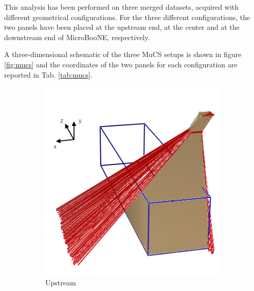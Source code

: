\documentclass[a4paper]{scrartcl}
\begin{document}
This analysis has been performed on three merged datasets, acquired with different geometrical configurations. For the three different configurations, the two panels have been placed at the upstream end, at the center and at the downstream end of MicroBooNE, respectively.

A three-dimensional schematic of the three MuCS setups is shown in figure \ref{fig:mucs} and the coordinates of the two panels for each configuration are reported in Tab. \ref{tab:mucs}.
\begin{figure}[htbp]
  \begin{subfigure}{0.30\textwidth}
    \includegraphics[width=\linewidth]{figures/upstream.png}
    \caption{Upstream} \label{fig:upstream}
  \end{subfigure}
  \begin{subfigure}{0.30\textwidth}

\end{subfigure}
\end{figure}
\end{document}

